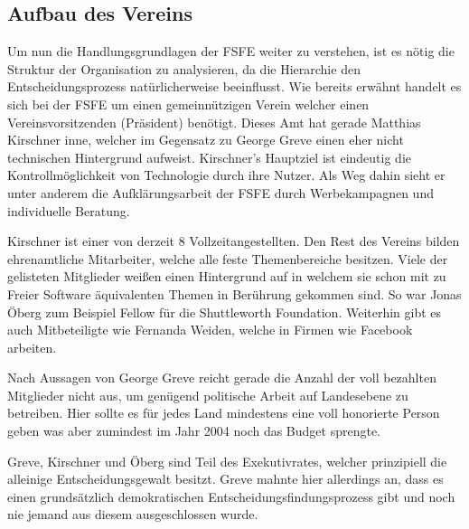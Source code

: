 \subsection{Aufbau des Vereins}
Um nun die Handlungsgrundlagen der FSFE weiter zu verstehen, ist es nötig
die Struktur der Organisation zu analysieren, da die Hierarchie den 
Entscheidungsprozess natürlicherweise beeinflusst. Wie bereits erwähnt handelt es sich bei
der FSFE um einen gemeinnützigen Verein welcher einen Vereinsvorsitzenden 
(Präsident) benötigt. Dieses Amt hat gerade Matthias Kirschner inne, welcher im 
Gegensatz zu George Greve einen eher nicht technischen Hintergrund aufweist.
Kirschner's Hauptziel ist eindeutig die Kontrollmöglichkeit von Technologie 
durch ihre Nutzer. Als Weg dahin sieht er unter anderem die Aufklärungsarbeit 
der FSFE durch Werbekampagnen und individuelle
Beratung.\cite{TAZKirschnerInterView} \cite{YTKirschnerInterView}

Kirschner ist einer von derzeit 8 Vollzeitangestellten.\cite{FsfeTeam} Den
Rest des Vereins bilden ehrenamtliche Mitarbeiter, welche alle feste 
Themenbereiche besitzen. Viele  
der gelisteten Mitglieder weißen 
einen 
Hintergrund auf in welchem sie schon mit zu Freier Software äquivalenten Themen 
in Berührung gekommen sind. So war Jonas Öberg zum Beispiel Fellow für die
Shuttleworth Foundation. Weiterhin gibt es auch Mitbeteiligte wie Fernanda 
Weiden, welche in Firmen wie Facebook arbeiten.\cite{FsfeTeam}

Nach Aussagen von George Greve reicht gerade die Anzahl der voll bezahlten 
Mitglieder nicht aus, um genügend politische Arbeit auf Landesebene zu 
betreiben. Hier sollte es für jedes Land mindestens eine voll honorierte Person
geben was aber zumindest im Jahr 2004 noch das Budget 
sprengte.\cite{PLGreveInterView}

Greve, Kirschner und Öberg sind Teil des Exekutivrates, welcher prinzipiell
die alleinige Entscheidungsgewalt besitzt. Greve mahnte hier allerdings an, dass
es einen grundsätzlich demokratischen Entscheidungsfindungsprozess gibt und 
noch nie jemand aus diesem ausgeschlossen wurde.

